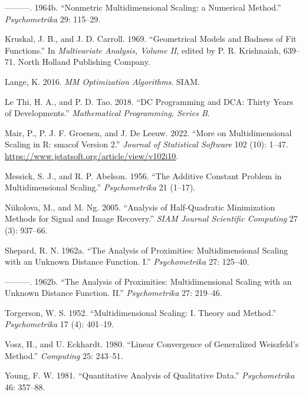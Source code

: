 \documentclass[
  12pt,
  letterpaper,
  DIV=11,
  numbers=noendperiod]{scrartcl}
\newlength{\cslhangindent}
\newenvironment{CSLReferences}[2] %
 {\begin{list}{}{%
  \setlength{\itemindent}{0pt}
  \setlength{\leftmargin}{0pt}
  \setlength{\parsep}{0pt}
  \ifodd #1
   \setlength{\leftmargin}{\cslhangindent}
   \setlength{\itemindent}{-1\cslhangindent}
  \fi
  \setlength{\itemsep}{#2\baselineskip}}}
 {\end{list}}
\begin{document}
\begin{CSLReferences}{1}{0}
---------. 1964b. {``{Nonmetric Multidimensional Scaling: a Numerical
Method}.''} \emph{Psychometrika} 29: 115--29.

Kruskal, J. B., and J. D. Carroll. 1969. {``{Geometrical Models and
Badness of Fit Functions}.''} In \emph{Multivariate Analysis, Volume
II}, edited by P. R. Krishnaiah, 639--71. North Holland Publishing
Company.

Lange, K. 2016. \emph{MM Optimization Algorithms}. SIAM.

Le Thi, H. A., and P. D. Tao. 2018. {``{DC Programming and DCA: Thirty
Years of Developments}.''} \emph{Mathematical Programming, Series B}.

Mair, P., P. J. F. Groenen, and J. De Leeuw. 2022. {``{More on
Multidimensional Scaling in R: smacof Version 2}.''} \emph{Journal of
Statistical Software} 102 (10): 1--47.
\url{https://www.jstatsoft.org/article/view/v102i10}.

Messick, S. J., and R. P. Abelson. 1956. {``{The Additive Constant
Problem in Multidimensional Scaling}.''} \emph{Psychometrika} 21
(1--17).

Niikolova, M., and M. Ng. 2005. {``Analysis of Half-Quadratic
Minimization Methods for Signal and Image Recovery.''} \emph{SIAM
Journal Scientific Computing} 27 (3): 937--66.

Shepard, R. N. 1962a. {``{The Analysis of Proximities: Multidimensional
Scaling with an Unknown Distance Function. I}.''} \emph{Psychometrika}
27: 125--40.

---------. 1962b. {``{The Analysis of Proximities: Multidimensional
Scaling with an Unknown Distance Function. II}.''} \emph{Psychometrika}
27: 219--46.

Torgerson, W. S. 1952. {``{Multidimensional Scaling: I. Theory and
Method}.''} \emph{Psychometrika} 17 (4): 401--19.

Vosz, H., and U. Eckhardt. 1980. {``{Linear Convergence of Generalized
{W}eiszfeld's Method}.''} \emph{Computing} 25: 243--51.

Young, F. W. 1981. {``{Quantitative Analysis of Qualitative Data}.''}
\emph{Psychometrika} 46: 357--88.


\end{CSLReferences}
\end{document}
